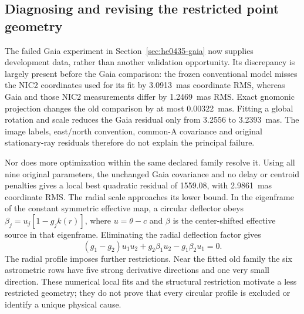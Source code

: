\subsection{Diagnosing and revising the restricted point geometry}
\label{sec:he0435-geometry-revision}

The failed Gaia experiment in Section~\ref{sec:he0435-gaia} now supplies
development data, rather than another validation opportunity. Its discrepancy
is largely present before the Gaia comparison: the frozen conventional model
misses the NIC2 coordinates used for its fit by 3.0913~mas coordinate RMS,
whereas Gaia and those NIC2 measurements differ by 1.2469~mas RMS. Exact
gnomonic projection changes the old comparison by at most 0.00322~mas.
Fitting a global rotation and scale reduces the Gaia residual only from
3.2556 to 3.2393~mas. The image labels, east/north convention, common-A
covariance and original stationary-ray residuals therefore do not explain
the principal failure.

Nor does more optimization within the same declared family resolve it.
Using all nine original parameters, the unchanged Gaia covariance and no
delay or centroid penalties gives a local best quadratic residual of
1559.08, with 2.9861~mas coordinate RMS. The radial scale approaches its
lower bound. In the eigenframe of the constant symmetric effective map,
a circular deflector obeys $\beta_j=u_j[1-g_j k(r)]$, where
$u=\theta-c$ and $\beta$ is the center-shifted effective source in
that eigenframe. Eliminating the radial deflection factor gives
\begin{equation}
 (g_1-g_2)u_1u_2+g_2\beta_1u_2-g_1\beta_2u_1=0.
 \label{eq:he0435-radial-obstruction}
\end{equation}
The radial profile imposes further restrictions. Near the fitted old
family the six astrometric rows have five strong derivative directions
and one very small direction. These numerical local fits and the
structural restriction motivate a less restricted geometry; they do not
prove that every circular profile is excluded or identify a unique
physical cause.

